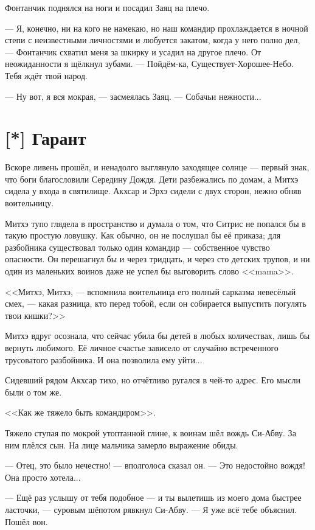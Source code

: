 Фонтанчик поднялся на ноги и посадил Заяц на плечо.

--- Я, конечно, ни на кого не намекаю, но наш командир прохлаждается в ночной степи с неизвестными личностями и любуется закатом, когда у него полно дел, --- Фонтанчик схватил меня за шкирку и усадил на другое плечо.
От неожиданности я щёлкнул зубами.
--- Пойдём-ка, Существует-Хорошее-Небо.
Тебя ждёт твой народ.

--- Ну вот, я вся мокрая, --- засмеялась Заяц.
--- Собачьи нежности...

\section{[*] Гарант}

Вскоре ливень прошёл, и ненадолго выглянуло заходящее солнце --- первый знак, что боги благословили Середину Дождя.
Дети разбежались по домам, а Митхэ сидела у входа в святилище.
Акхсар и Эрхэ сидели с двух сторон, нежно обняв воительницу.

Митхэ тупо глядела в пространство и думала о том, что Ситрис не попался бы в такую простую ловушку.
Как обычно, он не послушал бы её приказа;
для разбойника существовал только один командир --- собственное чувство опасности.
Он перешагнул бы и через тридцать, и через сто детских трупов, и ни один из маленьких воинов даже не успел бы выговорить слово <<mama>>.

<<Митхэ, Митхэ, --- вспомнила воительница его полный сарказма невесёлый смех, --- какая разница, кто перед тобой, если он собирается выпустить погулять твои кишки?>>

Митхэ вдруг осознала, что сейчас убила бы детей в любых количествах, лишь бы вернуть любимого.
Её личное счастье зависело от случайно встреченного трусоватого разбойника.
И она позволила ему уйти...

Сидевший рядом Акхсар тихо, но отчётливо ругался в чей-то адрес.
Его мысли были о том же.

<<Как же тяжело быть командиром>>.

Тяжело ступая по мокрой утоптанной глине, к воинам шёл вождь Си-Абву.
За ним плёлся сын.
На лице мальчика замерло выражение обиды.

--- Отец, это было нечестно! --- вполголоса сказал он.
--- Это недостойно вождя!
Она просто хотела...

--- Ещё раз услышу от тебя подобное --- и ты вылетишь из моего дома быстрее ласточки, --- суровым шёпотом рявкнул Си-Абву.
--- Я уже всё тебе объяснил.
Пошёл вон.

